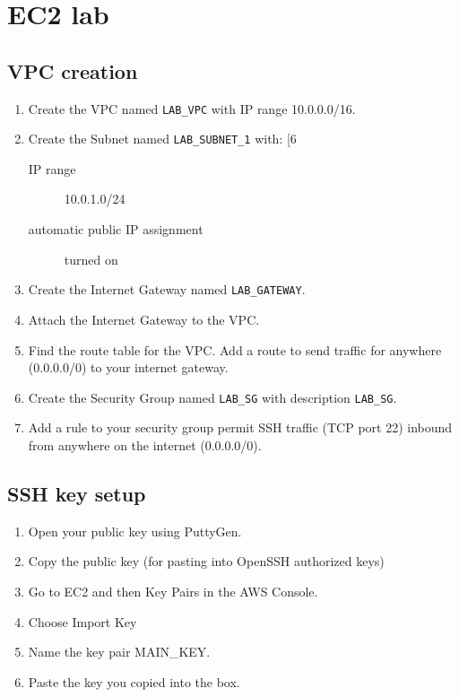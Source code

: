 \chapter{EC2 lab}

\section{VPC creation}

\begin{enumerate}

\item 
  Create the VPC named \texttt{LAB\_VPC} with IP range 10.0.0.0/16.

\item
  Create the Subnet named \texttt{LAB\_SUBNET\_1} with:
[6~  \begin{description}
  \item[IP range] 10.0.1.0/24
  \item[automatic public IP assignment] turned on
  \end{description}
  
\item
  Create the Internet Gateway named \texttt{LAB\_GATEWAY}.

\item
  Attach the Internet Gateway to the VPC.

\item
  Find the route table for the VPC.
  Add a route to send traffic for anywhere (0.0.0.0/0) to your internet gateway.

\item
  Create the Security Group named \texttt{LAB\_SG} with description \texttt{LAB\_SG}.

\item 
  Add a rule to your security group permit SSH traffic (TCP port 22) inbound from anywhere on the internet (0.0.0.0/0).
  
\end{enumerate}

\section{SSH key setup}

\begin{enumerate}
\item Open your public key using PuttyGen.
\item Copy the public key (for pasting into OpenSSH authorized keys)
\item Go to EC2 and then Key Pairs in the AWS Console.
\item Choose Import Key
\item Name the key pair MAIN\_KEY. 
\item Paste the key you copied into the box.
\end{enumerate}

